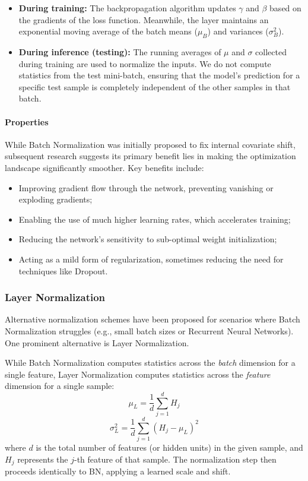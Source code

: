 \begin{itemize}
    \item \textbf{During training:} The backpropagation algorithm updates $\gamma$ and $\beta$ based on the gradients of the loss function. Meanwhile, the layer maintains an exponential moving average of the batch means ($\mu_B$) and variances ($\sigma_B^2$).
    \item \textbf{During inference (testing):} The running averages of $\mu$ and $\sigma$ collected during training are used to normalize the inputs. We do not compute statistics from the test mini-batch, ensuring that the model's prediction for a specific test sample is completely independent of the other samples in that batch.
\end{itemize}

\paragraph{Properties}
While Batch Normalization was initially proposed to fix internal covariate shift, subsequent research suggests its primary benefit lies in making the optimization landscape significantly smoother. Key benefits include:
\begin{itemize}
    \item Improving gradient flow through the network, preventing vanishing or exploding gradients;
    \item Enabling the use of much higher learning rates, which accelerates training;
    \item Reducing the network's sensitivity to sub-optimal weight initialization;
    \item Acting as a mild form of regularization, sometimes reducing the need for techniques like Dropout.
\end{itemize}

\subsubsection*{Layer Normalization}
Alternative normalization schemes have been proposed for scenarios where Batch Normalization struggles (e.g., small batch sizes or Recurrent Neural Networks). One prominent alternative is Layer Normalization. 

While Batch Normalization computes statistics across the \textit{batch} dimension for a single feature, Layer Normalization computes statistics across the \textit{feature} dimension for a single sample:
\begin{equation*}
    \mu_L = \frac{1}{d} \sum_{j=1}^{d} H_j
\end{equation*}
\begin{equation*}
    \sigma_L^2 = \frac{1}{d} \sum_{j=1}^{d} (H_j - \mu_L)^2
\end{equation*}
where $d$ is the total number of features (or hidden units) in the given sample, and $H_j$ represents the $j$-th feature of that sample. The normalization step then proceeds identically to BN, applying a learned scale and shift.

